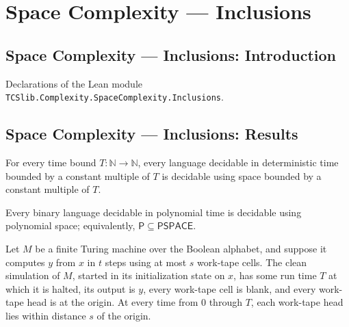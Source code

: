 \section{Space Complexity --- Inclusions}
\subsection*{Space Complexity --- Inclusions: Introduction}

Declarations of the Lean module \texttt{TCSlib.Complexity.SpaceComplexity.Inclusions}.

\subsection*{Space Complexity --- Inclusions: Results}

\begin{theorem}
\label{Complexity.DTIME_subset_SPACE}
\leanok
{}
For every time bound $T : \mathbb{N} \to \mathbb{N}$, every language decidable in
deterministic time bounded by a constant multiple of $T$ is decidable using space
bounded by a constant multiple of $T$.
\end{theorem}

\begin{theorem}
\label{Complexity.P_subset_PSPACE}
\leanok
{}
Every binary language decidable in polynomial time is decidable using polynomial space;
equivalently, $\mathsf{P} \subseteq \mathsf{PSPACE}$.
\end{theorem}

\begin{theorem}
\label{Complexity.b2b_clean_run}
\leanok
{}
Let $M$ be a finite Turing machine over the Boolean alphabet, and suppose it computes
$y$ from $x$ in $t$ steps using at most $s$ work-tape cells. The clean simulation of
$M$, started in its initialization state on $x$, has some run time $T$ at which it is
halted, its output is $y$, every work-tape cell is blank, and every work-tape head is at
the origin. At every time from $0$ through $T$, each work-tape head lies within distance
$s$ of the origin.
\end{theorem}

